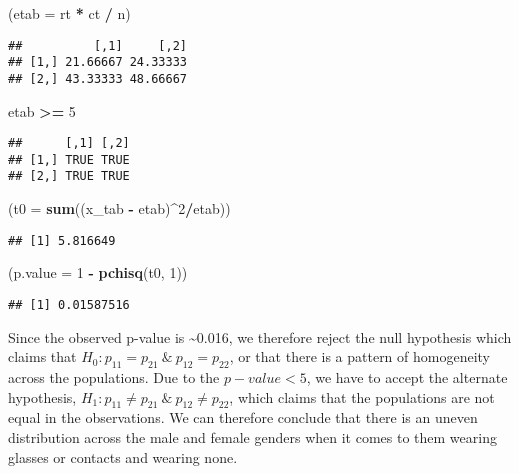 \documentclass[
]{article}
\newenvironment{Shaded}{\begin{snugshade}}{\end{snugshade}}
\newcommand{\DataTypeTok}[1]{\textcolor[rgb]{0.13,0.29,0.53}{#1}}
\newcommand{\DecValTok}[1]{\textcolor[rgb]{0.00,0.00,0.81}{#1}}
\newcommand{\KeywordTok}[1]{\textcolor[rgb]{0.13,0.29,0.53}{\textbf{#1}}}
\newcommand{\NormalTok}[1]{#1}
\newcommand{\OperatorTok}[1]{\textcolor[rgb]{0.81,0.36,0.00}{\textbf{#1}}}
\newcommand{\StringTok}[1]{\textcolor[rgb]{0.31,0.60,0.02}{#1}}
\begin{document}
\begin{Shaded}
\begin{Highlighting}[]
\NormalTok{(}\DataTypeTok{etab =}\NormalTok{ rt }\OperatorTok{*}\StringTok{ }\NormalTok{ct }\OperatorTok{/}\StringTok{ }\NormalTok{n)}
\end{Highlighting}
\end{Shaded}

\begin{verbatim}
##          [,1]     [,2]
## [1,] 21.66667 24.33333
## [2,] 43.33333 48.66667
\end{verbatim}

\begin{Shaded}
\begin{Highlighting}[]
\NormalTok{etab }\OperatorTok{>=}\StringTok{ }\DecValTok{5}
\end{Highlighting}
\end{Shaded}

\begin{verbatim}
##      [,1] [,2]
## [1,] TRUE TRUE
## [2,] TRUE TRUE
\end{verbatim}

\begin{Shaded}
\begin{Highlighting}[]
\NormalTok{(}\DataTypeTok{t0 =} \KeywordTok{sum}\NormalTok{((x_tab }\OperatorTok{-}\StringTok{ }\NormalTok{etab)}\OperatorTok{^}\DecValTok{2}\OperatorTok{/}\NormalTok{etab))}
\end{Highlighting}
\end{Shaded}

\begin{verbatim}
## [1] 5.816649
\end{verbatim}

\begin{Shaded}
\begin{Highlighting}[]
\NormalTok{(}\DataTypeTok{p.value =} \DecValTok{1} \OperatorTok{-}\StringTok{ }\KeywordTok{pchisq}\NormalTok{(t0, }\DecValTok{1}\NormalTok{))}
\end{Highlighting}
\end{Shaded}

\begin{verbatim}
## [1] 0.01587516
\end{verbatim}

Since the observed p-value is \textasciitilde0.016, we therefore reject
the null hypothesis which claims that
\(H_0: p_{11} = p_{21} \ \& \ p_{12} = p_{22}\), or that there is a
pattern of homogeneity across the populations. Due to the
\(p-value < 5\), we have to accept the alternate hypothesis,
\(H_1: p_{11} \neq p_{21} \ \& \ p_{12} \neq p_{22}\), which claims that
the populations are not equal in the observations. We can therefore
conclude that there is an uneven distribution across the male and female
genders when it comes to them wearing glasses or contacts and wearing
none.
\end{document}
